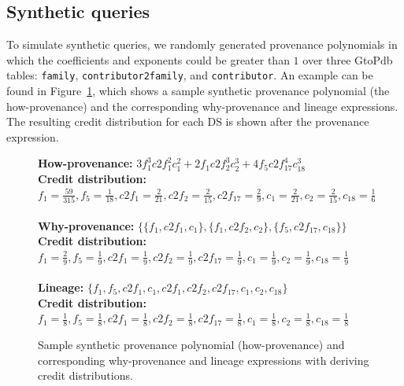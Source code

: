 \subsection{Synthetic queries}

To simulate synthetic queries, 
we randomly generated provenance polynomials in which the coefficients and exponents could be greater than $1$
over three GtoPdb tables: \texttt{family}, \texttt{contributor2family}, and \texttt{contributor}. An example can be found in Figure~\ref{fig:syntheticDistributions}, which shows a sample synthetic provenance polynomial (the how-provenance) and the corresponding why-provenance and lineage expressions.  The resulting credit distribution for each DS is shown after the provenance expression. 



\begin{figure}
{\footnotesize{\bf How-provenance:}
$
3 f_1^3 c2f_1^2 c_1^2 + 2 f_1 c2f_2^3 c_2^3 + 4 f_5 c2f_{17}^4 c_{18}^3
$ }\\
\hspace{0.5in} 
{\footnotesize{\bf Credit distribution:}\\ $f_1 = \frac{59}{315}, f_5 = \frac{1}{18}, c2f_1 = \frac{2}{21}, c2f_2 = \frac{2}{15}, 
c2f_{17}=\frac{2}{9} , c_1 = \frac{2}{21}, c_2 = \frac{2}{15}, c_{18} = \frac{1}{6} 
$
}
\\
\\
{\footnotesize{\bf Why-provenance:}
$
\{ \{f_1, c2f_1, c_1\}, \{f_1, c2f_2, c_2\}, \{ f_5, c2f_{17}, c_{18}\} \}
$ 
}
\\
{\footnotesize{\bf Credit distribution:}\\
$
f_1 = \frac{2}{9}, f_5 = \frac{1}{9}, c2f_1 = \frac{1}{9}, c2f_2 = \frac{1}{9}, 
c2f_{17}=\frac{1}{9} , c_1 = \frac{1}{9}, c_2 = \frac{1}{9}, c_{18} = \frac{1}{9} 
$
}
\\
\\
{\footnotesize{\bf Lineage: }
$
\{f_1, f_5, c2f_1, c_1, c2f_1, c2f_2, c2f_{17}, c_1, c_2, c_{18} \}
$}
\\
{\footnotesize{\bf Credit distribution:}\\
$
f_1 = \frac{1}{8}, f_5 = \frac{1}{8}, c2f_1 = \frac{1}{8}, c2f_2 = \frac{1}{8}, 
c2f_{17}=\frac{1}{8} , c_1 = \frac{1}{8}, c_2 = \frac{1}{8}, c_{18} = \frac{1}{8} 
$}
 \caption{Sample synthetic provenance polynomial (how-provenance) and corresponding why-provenance and lineage expressions with deriving credit distributions.}
 \label{fig:syntheticDistributions}
 \end{figure}

